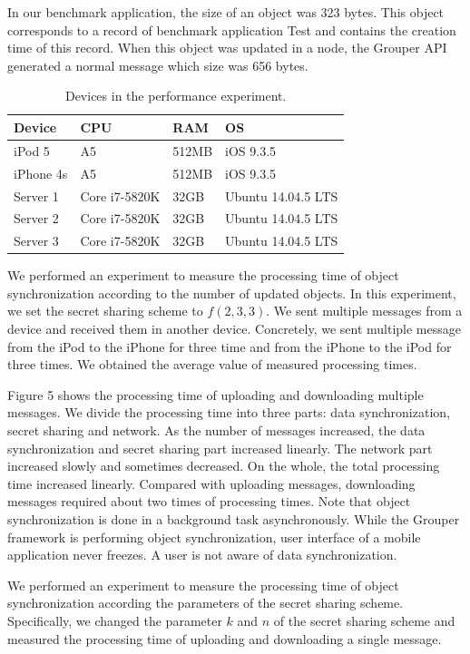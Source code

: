 \documentclass[twocolumn,10pt]{article}
\begin{document}
In our benchmark application, the size of an object was 323 bytes.
This object corresponds to a record of benchmark application Test and contains the creation time of this record.
When this object was updated in a node, the Grouper API generated a normal message which size was 656 bytes.

\begin{table}[t]
	\footnotesize
	\centering  
	\caption{Devices in the performance experiment.}
	\label{my-label}
	\begin{tabular}{llll}
		\hline
		\textbf{Device} & \textbf{CPU} & \textbf{RAM} & \textbf{OS} \\ \hline
		iPod 5 & A5 & 512MB & iOS 9.3.5 \\
		iPhone 4s & A5 & 512MB & iOS 9.3.5 \\
		Server 1 & Core i7-5820K & 32GB & Ubuntu 14.04.5 LTS \\
		Server 2 & Core i7-5820K & 32GB & Ubuntu 14.04.5 LTS \\
		Server 3 & Core i7-5820K & 32GB & Ubuntu 14.04.5 LTS \\ \hline
	\end{tabular}
\end{table}

We performed an experiment to measure the processing time of object synchronization according to the number of updated objects.
In this experiment, we set the secret sharing scheme to ${f(2, 3, 3)}$.
We sent multiple messages from a device and received them in another device. 
Concretely, we sent multiple message from the iPod to the iPhone for three time and from the iPhone to the iPod for three times.
We obtained the average value of measured processing times.

Figure 5 shows the processing time of uploading and downloading multiple messages.
We divide the processing time into three parts: data synchronization, secret sharing and network.
As the number of messages increased, the data synchronization and secret sharing part increased linearly. 
The network part increased slowly and sometimes decreased.
On the whole, the total processing time increased linearly.
Compared with uploading messages, downloading messages required about two times of processing times.
Note that object synchronization is done in a background task asynchronously.
While the Grouper framework is performing object synchronization, user interface of a mobile application never freezes.
A user is not aware of data synchronization.

We performed an experiment to measure the processing time of object synchronization according the parameters of the secret sharing scheme.
Specifically, we changed the parameter ${k}$  and ${n}$ of the secret sharing scheme and measured the processing time of uploading and downloading a single message.
\end{document}

